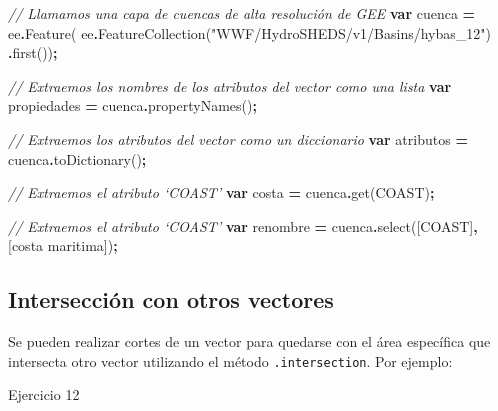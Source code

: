 \documentclass[
  12pt,
  letterpaper,
  twoside]{book}
\newenvironment{Shaded}{\begin{snugshade}}{\end{snugshade}}
\newcommand{\CommentTok}[1]{\textcolor[rgb]{0.56,0.35,0.01}{\textit{#1}}}
\newcommand{\FunctionTok}[1]{\textcolor[rgb]{0.00,0.00,0.00}{#1}}
\newcommand{\KeywordTok}[1]{\textcolor[rgb]{0.13,0.29,0.53}{\textbf{#1}}}
\newcommand{\NormalTok}[1]{#1}
\newcommand{\OperatorTok}[1]{\textcolor[rgb]{0.81,0.36,0.00}{\textbf{#1}}}
\newcommand{\StringTok}[1]{\textcolor[rgb]{0.31,0.60,0.02}{#1}}
\begin{document}
\begin{Shaded}
\begin{Highlighting}[]
\CommentTok{// Llamamos una capa de cuencas de alta resolución de GEE}
\KeywordTok{var}\NormalTok{ cuenca }\OperatorTok{=}\NormalTok{ ee}\OperatorTok{.}\FunctionTok{Feature}\NormalTok{(}
\NormalTok{  ee}\OperatorTok{.}\FunctionTok{FeatureCollection}\NormalTok{(}\StringTok{"WWF/HydroSHEDS/v1/Basins/hybas\_12"}\NormalTok{)}
  \OperatorTok{.}\FunctionTok{first}\NormalTok{())}\OperatorTok{;}

\CommentTok{// Extraemos los nombres de los atributos del vector como una lista}
\KeywordTok{var}\NormalTok{ propiedades }\OperatorTok{=}\NormalTok{ cuenca}\OperatorTok{.}\FunctionTok{propertyNames}\NormalTok{()}\OperatorTok{;}

\CommentTok{// Extraemos los atributos del vector como un diccionario}
\KeywordTok{var}\NormalTok{ atributos }\OperatorTok{=}\NormalTok{ cuenca}\OperatorTok{.}\FunctionTok{toDictionary}\NormalTok{()}\OperatorTok{;}

\CommentTok{// Extraemos el atributo ‘COAST’}
\KeywordTok{var}\NormalTok{ costa }\OperatorTok{=}\NormalTok{ cuenca}\OperatorTok{.}\FunctionTok{get}\NormalTok{(}\StringTok{\textquotesingle{}COAST\textquotesingle{}}\NormalTok{)}\OperatorTok{;}

\CommentTok{// Extraemos el atributo ‘COAST’}
\KeywordTok{var}\NormalTok{ renombre }\OperatorTok{=}\NormalTok{ cuenca}\OperatorTok{.}\FunctionTok{select}\NormalTok{([}\StringTok{\textquotesingle{}COAST\textquotesingle{}}\NormalTok{]}\OperatorTok{,}\NormalTok{[}\StringTok{\textquotesingle{}costa maritima\textquotesingle{}}\NormalTok{])}\OperatorTok{;}
\end{Highlighting}
\end{Shaded}

\hypertarget{intersecciuxf3n-con-otros-vectores}{%
\subsection{Intersección con otros vectores}\label{intersecciuxf3n-con-otros-vectores}}

Se pueden realizar cortes de un vector para quedarse con el área específica que intersecta otro vector utilizando el método \texttt{.intersection}. Por ejemplo:

Ejercicio 12
\end{document}
